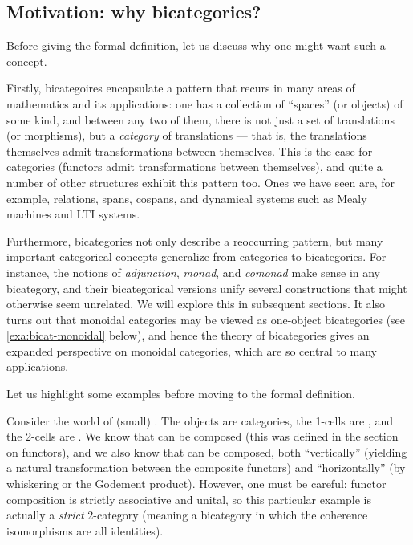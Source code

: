 \subsection{Motivation: why bicategories?}

Before giving the formal definition, let us discuss why one might want such a concept.

Firstly, bicategoires encapsulate a pattern that recurs in many areas of mathematics and its applications: one has a collection of ``spaces'' (or objects) of some kind, and between any two of them, there is not just a set of translations (or morphisms), but a \emph{category} of translations --- that is, the translations themselves admit transformations between themselves. This is the case for categories (functors admit transformations between themselves), and quite a number of other structures exhibit this pattern too. Ones we have seen are, for example, relations, spans, cospans, and dynamical systems such as Mealy machines and LTI systems.

Furthermore, bicategories not only describe a reoccurring pattern, but many important categorical concepts generalize from categories to bicategories.
For instance, the notions of \emph{adjunction}, \emph{monad}, and \emph{comonad} make sense in any bicategory, and their bicategorical versions unify several constructions that might otherwise seem unrelated. We will explore this in subsequent sections. It also turns out that monoidal categories may be viewed as one-object bicategories (see \cref{exa:bicat-monoidal} below), and hence the theory of bicategories gives an expanded perspective on monoidal categories, which are so central to many applications. 

Let us highlight some examples before moving to the formal definition. 

\begin{example}
    \label{exa:bicat-motivation-cat}
    Consider the world of (small) .
    The objects are categories, the 1-cells are , and the 2-cells are .
    We know that  can be composed (this was defined in the section on functors), and we also know that  can be composed, both ``vertically'' (yielding a natural transformation between the composite functors) and ``horizontally'' (by whiskering or the Godement product).
    However, one must be careful: functor composition is strictly associative and unital, so this particular example is actually a \emph{strict} 2-category (meaning a bicategory in which the coherence isomorphisms are all identities).
\end{example}

